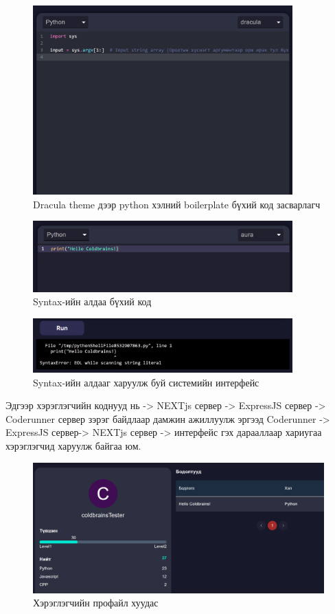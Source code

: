 \begin{figure}[H]
  \centering
  \includegraphics[width=10cm]{img/testEditor.PNG}
  \caption{Dracula theme дээр python хэлний boilerplate бүхий код засварлагч}
\end{figure}

\begin{figure}[H]
  \centering
  \includegraphics[width=10cm]{img/syntaxErr.PNG}
  \caption{Syntax-ийн алдаа бүхий код}
\end{figure}

\begin{figure}[H]
  \centering
  \includegraphics[width=10cm]{img/syntaxErrOut.PNG}
  \caption{Syntax-ийн алдааг харуулж буй системийн интерфейс}
\end{figure}

Эдгээр хэрэглэгчийн коднууд нь -> NEXTjs сервер -> ExpressJS сервер -> Coderunner сервер зэрэг байдлаар дамжин ажиллуулж эргээд Coderunner -> ExpressJS  сервер-> NEXTjs сервер -> интерфейс гэх дарааллаар хариугаа хэрэглэгчид харуулж байгаа юм. 

\begin{figure}[H]
  \centering
  \includegraphics[width=12cm]{img/profileImp.PNG}
  \caption{Хэрэглэгчийн профайл хуудас}
\end{figure}

